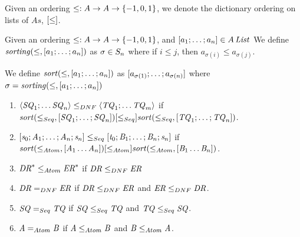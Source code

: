 \documentclass[numbers]{sigplanconf}
\begin{document}
\begin{definition}
  Given an ordering $\leq : A \rightarrow A \rightarrow \{-1,0,1\}$,
  we denote the dictionary ordering on lists of $As$, $[ \leq ]$.
\end{definition}

\begin{definition}
  Given an ordering $\leq : A \rightarrow A \rightarrow \{-1,0,1\}$,
  and $[ a_1;\ldots;a_n ]\in A\,\mathit{List}$
  We define $\mathit{sorting}(\leq,[ a_1;\ldots;a_n ])$ as
  $\sigma \in S_{n}$ where if $i\leq j$,
  then $a_{\sigma(i)} \leq a_{\sigma(j)}$.

  We define $\mathit{sort}(\leq,[ a_1;\ldots;a_n ])$ as
  $[ a_{\sigma(1)};\ldots;a_{\sigma(n)} ]$ where
  $\sigma=\mathit{sorting}(\leq,[ a_1;\ldots;a_n ])$
\end{definition}

\begin{definition}
  \begin{enumerate}
  \item
    $\langle\mathit{SQ}_1;\ldots\mathit{SQ}_n\rangle
    \leq_{DNF}
    \langle\mathit{TQ}_1;\ldots\mathit{TQ}_m\rangle$
    if
    $\mathit{sort}(\leq_{Seq},[ \mathit{SQ}_1;\ldots;\mathit{SQ}_n ])
    [ \leq_{Seq} ]
    \mathit{sort}(\leq_{Seq},[\mathit{TQ}_1;\ldots;\mathit{TQ}_n])$.
    
  \item
    $[\mathit{s}_0;\mathit{A}_1;\ldots;\mathit{A}_n;\mathit{s}_n]
    \leq_{Seq}
    [\mathit{t}_0;\mathit{B}_1;\ldots;\mathit{B}_n;\mathit{s}_n]$
    if
    $\mathit{sort}(\leq_{Atom},[ \mathit{A}_1\ldots\mathit{A}_n ])
    [ \leq_{Atom} ]
    \mathit{sort}(\leq_{Atom},[\mathit{B}_1\ldots\mathit{B}_n])$.

  \item
    ${\mathit{DR}}^* \leq_{Atom} {\mathit{ER}}^*$
    if
    $\mathit{DR} \leq_{DNF} \mathit{ER}$

  \item 
    $\mathit{DR} =_{DNF} \mathit{ER}$
    if
    $\mathit{DR} \leq_{DNF} \mathit{ER}$ and $\mathit{ER} \leq_{DNF} \mathit{DR}$.

  \item
    $\mathit{SQ} =_{Seq} \mathit{TQ}$
    if
    $\mathit{SQ} \leq_{Seq} \mathit{TQ}$ and $\mathit{TQ} \leq_{Seq}
    \mathit{SQ}$.

  \item
    $\mathit{A} =_{Atom} \mathit{B}$
    if
    $\mathit{A} \leq_{Atom} \mathit{B}$ and $\mathit{B} \leq_{Atom} \mathit{A}$.
  \end{enumerate}
\end{definition}
\end{document}
